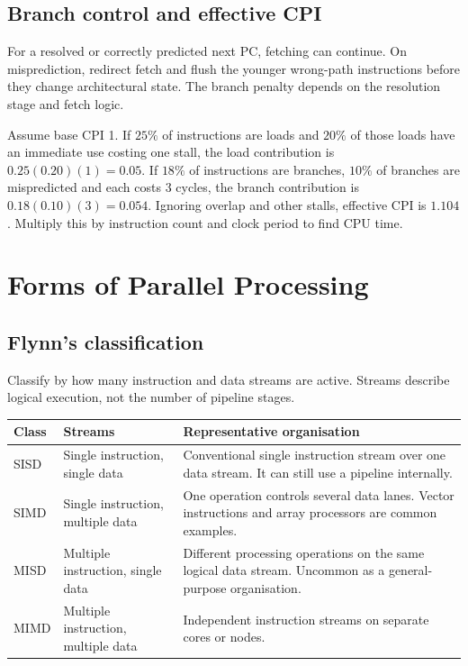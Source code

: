 \documentclass[12pt,a4paper]{article}
\begin{document}
\subsection{Branch control and effective CPI}
For a resolved or correctly predicted next PC, fetching can continue. On misprediction, redirect fetch and flush the younger wrong-path instructions before they change architectural state. The branch penalty depends on the resolution stage and fetch logic.
\begin{tcolorbox}[examplebox,title={Sum independent stall contributions}]
Assume base CPI 1. If $25\%$ of instructions are loads and $20\%$ of those loads have an immediate use costing one stall, the load contribution is $0.25(0.20)(1)=0.05$. If $18\%$ of instructions are branches, $10\%$ of branches are mispredicted and each costs 3 cycles, the branch contribution is $0.18(0.10)(3)=0.054$. Ignoring overlap and other stalls, effective CPI is $1.104$. Multiply this by instruction count and clock period to find CPU time.
\end{tcolorbox}

\section{Forms of Parallel Processing}
\subsection{Flynn's classification}
Classify by how many instruction and data streams are active. Streams describe logical execution, not the number of pipeline stages.
\par\vspace{6pt}\noindent
\begin{tabularx}{\linewidth}{|B{2.3cm}|Y|Y|}\hline
Class & Streams & Representative organisation \\ \hline
SISD & Single instruction, single data & Conventional single instruction stream over one data stream. It can still use a pipeline internally. \\ \hline
SIMD & Single instruction, multiple data & One operation controls several data lanes. Vector instructions and array processors are common examples. \\ \hline
MISD & Multiple instruction, single data & Different processing operations on the same logical data stream. Uncommon as a general-purpose organisation. \\ \hline
MIMD & Multiple instruction, multiple data & Independent instruction streams on separate cores or nodes. \\ \hline
\end{tabularx}
\end{document}
